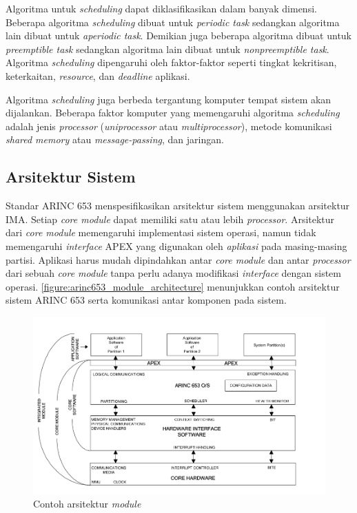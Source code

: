 Algoritma untuk \textit{scheduling} dapat diklasifikasikan dalam banyak dimensi.
Beberapa algoritma \textit{scheduling} dibuat untuk \textit{periodic task} sedangkan algoritma lain dibuat untuk \textit{aperiodic task}.
Demikian juga beberapa algoritma dibuat untuk \textit{preemptible task} sedangkan algoritma lain dibuat untuk \textit{nonpreemptible task}.
Algoritma \textit{scheduling} dipengaruhi oleh faktor-faktor seperti tingkat kekritisan, keterkaitan, \textit{resource}, dan \textit{deadline} aplikasi.

Algoritma \textit{scheduling} juga berbeda tergantung komputer tempat sistem akan dijalankan.
Beberapa faktor komputer yang memengaruhi algoritma \textit{scheduling} adalah jenis \textit{processor} (\textit{uniprocessor} atau \textit{multiprocessor}), metode komunikasi \textit{shared memory} atau \textit{message-passing}, dan jaringan.

\subsection{Arsitektur Sistem}

Standar ARINC 653 menspesifikasikan arsitektur sistem menggunakan arsitektur IMA.
Setiap \textit{core module} dapat memiliki satu atau lebih \textit{processor}. Arsitektur dari \textit{core module} memengaruhi implementasi sistem operasi, namun tidak memengaruhi \textit{interface} APEX yang digunakan oleh \textit{aplikasi} pada masing-masing partisi.
Aplikasi harus mudah dipindahkan antar \textit{core module} dan antar \textit{processor} dari sebuah \textit{core module} tanpa perlu adanya modifikasi \textit{interface} dengan sistem operasi.
\autoref{figure:arinc653_module_architecture} menunjukkan contoh arsitektur sistem ARINC 653 serta komunikasi antar komponen pada sistem.

\begin{figure}[htbp]
    \centering
    \includegraphics[scale=0.4]{resources/arinc653-architecture.png}
    \caption[Contoh arsitektur \textit{module}]{Contoh arsitektur \textit{module} \citep{AirlinesElectronicEngineeringCommittee2012}}
    \label{figure:arinc653_module_architecture}
\end{figure}

